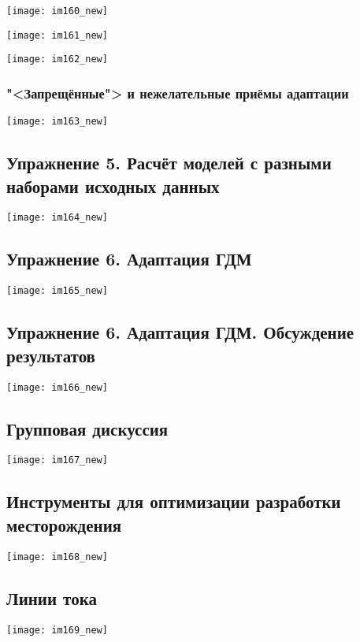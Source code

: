 \documentclass[main.tex]{subfiles}
\begin{document}
\texttt{[image: im160\_new]}

\texttt{[image: im161\_new]}

\texttt{[image: im162\_new]}

\subsubsection{"<Запрещённые"> и нежелательные приёмы адаптации}

\texttt{[image: im163\_new]}

\subsection{Упражнение 5. Расчёт моделей с разными наборами исходных данных}

\texttt{[image: im164\_new]}

\subsection{Упражнение 6. Адаптация ГДМ}

\texttt{[image: im165\_new]}

\subsection{Упражнение 6. Адаптация ГДМ. Обсуждение результатов}

\texttt{[image: im166\_new]}

\subsection{Групповая дискуссия}

\texttt{[image: im167\_new]}

\subsection{Инструменты для оптимизации разработки месторождения}

\texttt{[image: im168\_new]}

\subsection{Линии тока}

\texttt{[image: im169\_new]}
\end{document}
